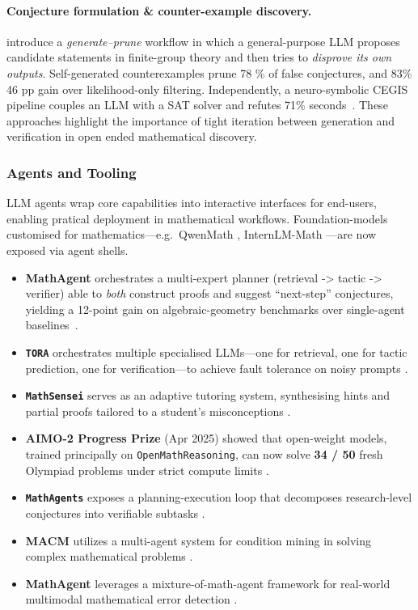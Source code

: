 \documentclass[acmsmall,anonymous]{acmart}
\begin{document}
\paragraph{Conjecture formulation \& counter-example discovery.}
\citet{chuharski2024mining} introduce a \emph{generate–prune} workflow
in which a general-purpose LLM proposes candidate statements in
finite-group theory and then tries to \emph{disprove its own outputs}.
Self-generated counterexamples prune 78 \% of false conjectures, and
83\% %
46 pp gain over likelihood-only filtering. Independently, a
neuro-symbolic CEGIS pipeline couples an LLM with a SAT solver and
refutes 71\% %
seconds~\cite{jha2023neurosymbolic}. These approaches highlight the importance of tight iteration between generation and verification in open ended mathematical discovery. 


\subsubsection{Agents and Tooling}\label{sec:agents}
LLM agents wrap core capabilities into interactive interfaces for end-users, enabling pratical deployment in mathematical workflows. Foundation-models customised for mathematics—e.g.\ QwenMath \cite{yang2024qwenmath}, InternLM-Math \cite{ying2024 b internlm}—are now exposed via agent shells.

\begin{itemize}
    \item \textbf{MathAgent} orchestrates a multi-expert planner
(retrieval -> tactic -> verifier) able to \emph{both} construct proofs and
suggest “next-step” conjectures, yielding a 12-point gain on
algebraic-geometry benchmarks over single-agent
baselines~\cite{yan2025mathagent}.    
    \item \textbf{\texttt{TORA}} orchestrates multiple specialised LLMs—one for retrieval, one for tactic prediction, one for verification—to achieve fault tolerance on noisy prompts \cite{gou2024tora}.  
    \item \textbf{\texttt{MathSensei}} serves as an adaptive tutoring system, synthesising hints and partial proofs tailored to a student’s misconceptions \cite{sun2024mathsensei}.  
    \item \textbf{AIMO-2 Progress Prize} (Apr 2025) showed that
    open-weight models, trained principally on
    \texttt{OpenMathReasoning}, can now solve \textbf{34 / 50} fresh
    Olympiad problems under strict compute limits
    \cite{Moshkov2025OpenMath}.
    \item \textbf{\texttt{MathAgents}} exposes a planning-execution loop that decomposes research-level conjectures into verifiable subtasks \cite{jones2024mathagents}. 
    \item \textbf{MACM} utilizes a multi-agent system for condition mining in solving complex mathematical problems \cite{lei2024}.
    \item \textbf{MathAgent} leverages a mixture-of-math-agent framework for real-world multimodal mathematical error detection \cite{yan2025b}.
\end{itemize}
\end{document}
